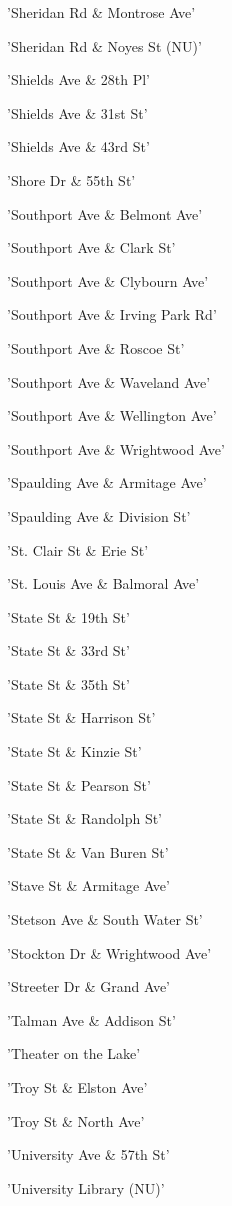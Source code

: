 \documentclass[11pt]{article}
\begin{document}
\begin{enumerate*}
\item 'Sheridan Rd \& Montrose Ave'
\item 'Sheridan Rd \& Noyes St (NU)'
\item 'Shields Ave \& 28th Pl'
\item 'Shields Ave \& 31st St'
\item 'Shields Ave \& 43rd St'
\item 'Shore Dr \& 55th St'
\item 'Southport Ave \& Belmont Ave'
\item 'Southport Ave \& Clark St'
\item 'Southport Ave \& Clybourn Ave'
\item 'Southport Ave \& Irving Park Rd'
\item 'Southport Ave \& Roscoe St'
\item 'Southport Ave \& Waveland Ave'
\item 'Southport Ave \& Wellington Ave'
\item 'Southport Ave \& Wrightwood Ave'
\item 'Spaulding Ave \& Armitage Ave'
\item 'Spaulding Ave \& Division St'
\item 'St. Clair St \& Erie St'
\item 'St. Louis Ave \& Balmoral Ave'
\item 'State St \& 19th St'
\item 'State St \& 33rd St'
\item 'State St \& 35th St'
\item 'State St \& Harrison St'
\item 'State St \& Kinzie St'
\item 'State St \& Pearson St'
\item 'State St \& Randolph St'
\item 'State St \& Van Buren St'
\item 'Stave St \& Armitage Ave'
\item 'Stetson Ave \& South Water St'
\item 'Stockton Dr \& Wrightwood Ave'
\item 'Streeter Dr \& Grand Ave'
\item 'Talman Ave \& Addison St'
\item 'Theater on the Lake'
\item 'Troy St \& Elston Ave'
\item 'Troy St \& North Ave'
\item 'University Ave \& 57th St'
\item 'University Library (NU)'

\end{enumerate*}
\end{document}
